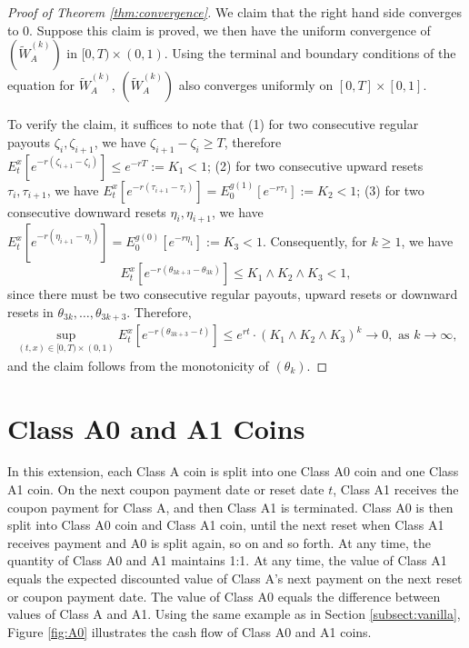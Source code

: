 \documentclass[draft, noinfoline]{ectaart}
\numberwithin{equation}{section}
\theoremstyle{plain}
\begin{document}
\begin{appendices}
\begin{proof}[Proof of Theorem \ref{thm:convergence}]
	We claim that the right hand side converges to 0. Suppose this claim is proved, we then have the uniform convergence of $(\tilde{W}_A^{(k)})$ in $[0,T)\times(0,1)$. Using the terminal and boundary conditions of the equation for $\tilde{W}_A^{(k)}$,  $(\tilde{W}_A^{(k)})$ also converges uniformly on $[0,T]\times[0,1]$.

	To verify the claim, it suffices to note that (1) for two consecutive regular payouts $\zeta_i,\zeta_{i+1}$, we have $\zeta_{i+1}-\zeta_{i}\ge T$, therefore $E_t^x\left[e^{-r(\zeta_{i+1}-\zeta_i)}\right]\le e^{-rT}:=K_1<1$; (2) for two consecutive upward resets $\tau_i,\tau_{i+1}$, we have $E_t^x\left[e^{-r(\tau_{i+1}-\tau_i)}\right]=E_0^{g(1)}\left[e^{-r\tau_1}\right]:=K_2<1$; (3) for two consecutive downward resets $\eta_i,\eta_{i+1}$, we have $E_t^x\left[e^{-r(\eta_{i+1}-\eta_i)}\right]=E_0^{g(0)}\left[e^{-r\eta_1}\right]:=K_3<1$. Consequently, for $k\ge 1$, we have $$E_t^x\left[e^{-r(\theta_{3k+3}-\theta_{3k})}\right]\le K_1\land K_2\land K_3<1,$$
	since there must be two consecutive regular payouts, upward resets or downward resets in $\theta_{3k},\ldots,\theta_{3k+3}$. Therefore, 
	\begin{align*}
		\sup_{(t,x)\in[0,T)\times(0,1)} E_t^x\left[e^{-r(\theta_{3k+3}-t)}\right]\le e^{rt}\cdot(K_1\land K_2\land K_3)^k\to 0,\text{ as }k\to\infty,
	\end{align*}
	and the claim follows from the monotonicity of $(\theta_k)$.
\end{proof}


\section{Class A0 and A1 Coins}\label{sect:A0}

In this extension, each Class A coin is split into one Class A0 coin and one Class A1 coin. On the next coupon payment date or reset date $t$, Class A1 receives the coupon payment for Class A, and then Class A1 is terminated. Class A0 is then split into Class A0 coin and Class A1 coin, until the next reset when Class A1 receives payment and A0 is split again, so on and so forth. At any time, the quantity of Class A0 and A1 maintains 1:1. At any time, the value of Class A1 equals the expected discounted value of Class A's next payment on the next reset or coupon payment date. The value of Class A0 equals the difference between values of Class A and A1. Using the same example as in Section \ref{subsect:vanilla}, Figure \ref{fig:A0} illustrates the cash flow of Class A0 and A1 coins.


\end{appendices}
\end{document}
